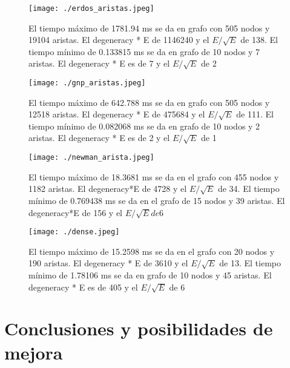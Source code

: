 \documentclass[%
    a4paper,%
    fontsize=12pt,%
    DIV=12,
    twoside,%
    openright,%
    titlepage=true,%
    headsepline,%
    toc=bibliography,%
    parskip=half,%
    cleardoublepage=empty,%
    headings=big,%
]{scrbook}
\begin{document}
\begin{figure}
  \centering
   \texttt{[image: ./erdos\_aristas.jpeg]}

  \caption{El tiempo máximo de 1781.94 ms se da en grafo con 505 nodos y 19104 aristas. El degeneracy * E de 1146240 y el $E/\sqrt{E}$ de 138. El tiempo mínimo de 0.133815 ms se da en grafo de 10 nodos y 7 aristas. El degeneracy * E es de 7 y el $E/\sqrt{E}$ de 2 }\label{fig:erdos}
\end{figure}


\begin{figure}
  \centering
   \texttt{[image: ./gnp\_aristas.jpeg]}

  \caption{El tiempo máximo de 642.788 ms se da en grafo con 505 nodos y 12518 aristas. El degeneracy * E de 475684 y el $E/\sqrt{E}$  de 111. El tiempo mínimo de 0.082068 ms se da en grafo de 10 nodos y 2 aristas. El degeneracy * E es de 2 y el $E/\sqrt{E}$ de 1 }\label{fig:gnp}
\end{figure}

\begin{figure}
  \centering
   \texttt{[image: ./newman\_arista.jpeg]}

  \caption{El tiempo máximo de 18.3681 ms se da en el grafo con 455
nodos y 1182 aristas. El degeneracy*E de 4728 y el $E/\sqrt{E}$ de 34. El tiempo mínimo de 0.769438 ms se da en el grafo de 15 nodos y 39 aristas. El degeneracy*E de 156 y el $E/\sqrt{E} de 6$
 }\label{fig:newman}
\end{figure} 

\begin{figure}
  \centering
   \texttt{[image: ./dense.jpeg]}

  \caption{El tiempo máximo de 15.2598 ms se da en el grafo con 20 nodos y 190 aristas. El degeneracy * E de 3610 y el $E/\sqrt{E}$  de 13. El tiempo mínimo de 1.78106 ms se da en grafo de 10 nodos y 45 aristas. El degeneracy * E es de 405 y el $E/\sqrt{E}$ de 6  }\label{fig:dense}
\end{figure}

\chapter{Conclusiones y posibilidades de mejora}
\label{sec:final}

\backmatter



\end{document}
